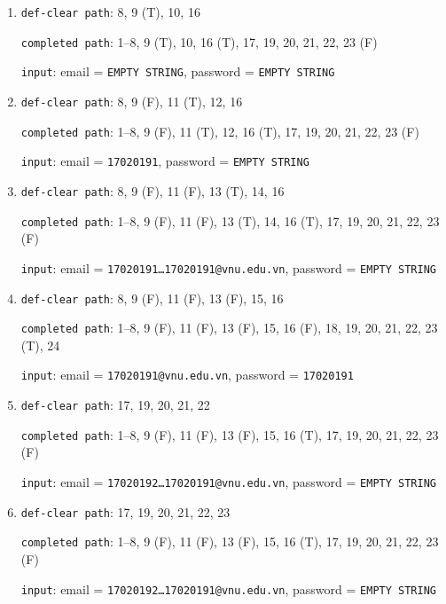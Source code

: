 \documentclass{article}
\begin{document}
\begin{enumerate}
    \item \texttt{def-clear path}: 8, 9 (T), 10, 16
          \par \texttt{completed path}: 1--8, 9 (T), 10, 16 (T), 17, 19, 20, 21, 22, 23 (F)
          \par \texttt{input}: email = \texttt{EMPTY STRING}, password = \texttt{EMPTY STRING}

    \item \texttt{def-clear path}: 8, 9 (F), 11 (T), 12, 16
          \par \texttt{completed path}: 1--8, 9 (F), 11 (T), 12, 16 (T), 17, 19, 20, 21, 22, 23 (F)
          \par \texttt{input}: email = \texttt{17020191}, password = \texttt{EMPTY STRING}

    \item \texttt{def-clear path}: 8, 9 (F), 11 (F), 13 (T), 14, 16
          \par \texttt{completed path}: 1--8, 9 (F), 11 (F), 13 (T), 14, 16 (T), 17, 19, 20, 21, 22, 23 (F)
          \par \texttt{input}: email = \texttt{17020191\ldots17020191@vnu.edu.vn}, password = \texttt{EMPTY STRING}

    \item \texttt{def-clear path}: 8, 9 (F), 11 (F), 13 (F), 15, 16
          \par \texttt{completed path}: 1--8, 9 (F), 11 (F), 13 (F), 15, 16 (F), 18, 19, 20, 21, 22, 23 (T), 24
          \par \texttt{input}: email = \texttt{17020191@vnu.edu.vn}, password = \texttt{17020191}

    \item \texttt{def-clear path}: 17, 19, 20, 21, 22
          \par \texttt{completed path}: 1--8, 9 (F), 11 (F), 13 (F), 15, 16 (T), 17, 19, 20, 21, 22, 23 (F)
          \par \texttt{input}: email = \texttt{17020192\ldots17020191@vnu.edu.vn}, password = \texttt{EMPTY STRING}

    \item \texttt{def-clear path}: 17, 19, 20, 21, 22, 23
          \par \texttt{completed path}: 1--8, 9 (F), 11 (F), 13 (F), 15, 16 (T), 17, 19, 20, 21, 22, 23 (F)
          \par \texttt{input}: email = \texttt{17020192\ldots17020191@vnu.edu.vn}, password = \texttt{EMPTY STRING}


\end{enumerate}
\end{document}
